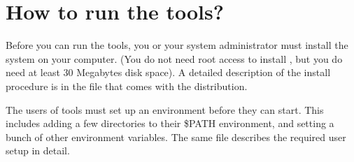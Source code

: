 \section{How to run the \protect{} tools?}
Before you can run the  tools, you or your system administrator must
install the system on your computer. (You do not need root access to install
, but you do need at least 30 Megabytes disk space). A detailed
description of the install procedure is in the file  
that comes with the  distribution. 

The users of  tools must set up an environment before they can
start. This includes adding a few directories to their \$PATH environment, and
setting a bunch of other environment variables. The same 
file describes the required user setup in detail.

\newpage
